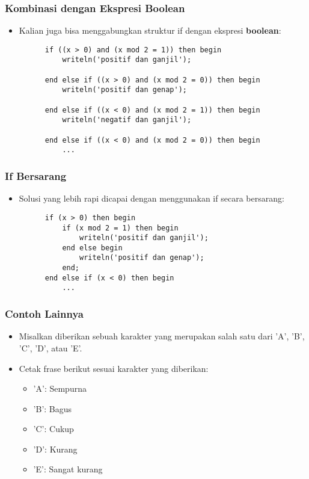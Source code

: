 \documentclass{beamer}
\begin{document}
\begin{frame}[fragile]
\frametitle{Kombinasi dengan Ekspresi Boolean}
\begin{itemize}
	\item Kalian juga bisa menggabungkan struktur if dengan ekspresi \textbf{boolean}:
	\begin{lstlisting}
	  if ((x > 0) and (x mod 2 = 1)) then begin
	      writeln('positif dan ganjil');
	      
	  end else if ((x > 0) and (x mod 2 = 0)) then begin
	      writeln('positif dan genap');
	      
	  end else if ((x < 0) and (x mod 2 = 1)) then begin
	      writeln('negatif dan ganjil');
	      
	  end else if ((x < 0) and (x mod 2 = 0)) then begin
 	      ...
	\end{lstlisting}
\end{itemize}
\end{frame}

\begin{frame}[fragile]
\frametitle{If Bersarang}
\begin{itemize}
	\item Solusi yang lebih rapi dicapai dengan menggunakan if secara bersarang:
	\begin{lstlisting}
	  if (x > 0) then begin
	      if (x mod 2 = 1) then begin
	          writeln('positif dan ganjil');
	      end else begin
	          writeln('positif dan genap');
	      end;
	  end else if (x < 0) then begin
	      ...
	\end{lstlisting}
\end{itemize}
\end{frame}

\begin{frame}
\frametitle{Contoh Lainnya}
\begin{itemize}
	\item Misalkan diberikan sebuah karakter yang merupakan salah satu dari 'A', 'B', 'C', 'D', atau 'E'.
	\item Cetak frase berikut sesuai karakter yang diberikan:
	\begin{itemize}
		\item 'A': Sempurna
		\item 'B': Bagus
		\item 'C': Cukup
		\item 'D': Kurang
		\item 'E': Sangat kurang
	\end{itemize}
\end{itemize}
\end{frame}
\end{document}
